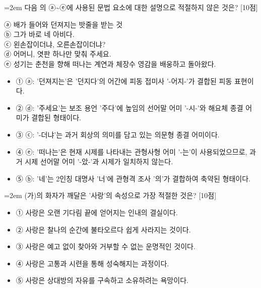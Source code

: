 \documentclass[10pt,a4paper]{article}
\newcommand{\qnum}[1]{%
  \tikz[baseline=(num.base)]{%
    \node[circle, fill=numCircle, text=white, inner sep=0pt,
          minimum size=18pt, font=\small\bfseries] (num) {#1};%
  }%
}
\newcommand{\pts}[1]{%
  \hfill\textcolor{ptsBadge}{[#1점]}%
}
\begin{document}
\vspace{4mm}
\begin{minipage}{\columnwidth}
{\hangindent=2em
\qnum{5}\enspace 다음 의 ⓐ\textasciitilde{}ⓔ에 사용된 문법 요소에 대한 설명으로 적절하지 않은 것은? \pts{10}
\par}

\vspace{3mm}
\begin{tcolorbox}[bogi]
ⓐ 배가 들어와 던져지는 밧줄을 받는 것 \\{}
ⓑ 그가 바로 네 아비다. \\{}
ⓒ 왼손잡이더냐, 오른손잡이더냐? \\{}
ⓓ 어머니, 엿판 하나만 맞춰 주세요. \\{}
ⓔ 성기는 춘천을 향해 떠나는 계연과 체장수 영감을 배웅하고 돌아왔다.
\end{tcolorbox}
\vspace{3mm}
\begin{itemize}[leftmargin=2.5em, labelsep=0.3em, label={}, itemsep=4pt, parsep=1pt, topsep=0pt]
  \item ① ⓐ: '던져지는'은 '던지다'의 어간에 피동 접미사 '-어지-'가 결합된 피동 표현이다.
  \item ② ⓓ: '주세요'는 보조 용언 '주다'에 높임의 선어말 어미 '-시-'와 해요체 종결 어미가 결합된 형태이다.
  \item ③ ⓒ: '-더냐'는 과거 회상의 의미를 담고 있는 의문형 종결 어미이다.
  \item ④ ⓔ: '떠나는'은 현재 시제를 나타내는 관형사형 어미 '-는'이 사용되었으므로, 과거 시제 선어말 어미 '-았-'과 시제가 일치하지 않는다.
  \item ⑤ ⓑ: '네'는 2인칭 대명사 '너'에 관형격 조사 '의'가 결합하여 축약된 형태이다.
\end{itemize}
\end{minipage}
\vspace{4mm}

\vspace{4mm}
\begin{minipage}{\columnwidth}
{\hangindent=2em
\qnum{6}\enspace (가)의 화자가 깨달은 '사랑'의 속성으로 가장 적절한 것은? \pts{10}
\par}

\vspace{3mm}
\begin{itemize}[leftmargin=2.5em, labelsep=0.3em, label={}, itemsep=4pt, parsep=1pt, topsep=0pt]
  \item ① 사랑은 오랜 기다림 끝에 얻어지는 인내의 결실이다.
  \item ② 사랑은 찰나의 순간에 불타오르다 쉽게 사라지는 것이다.
  \item ③ 사랑은 예고 없이 찾아와 거부할 수 없는 운명적인 것이다.
  \item ④ 사랑은 고통과 시련을 통해 성숙해지는 과정이다.
  \item ⑤ 사랑은 상대방의 자유를 구속하고 소유하려는 욕망이다.
\end{itemize}
\end{minipage}
\vspace{4mm}
\end{document}
